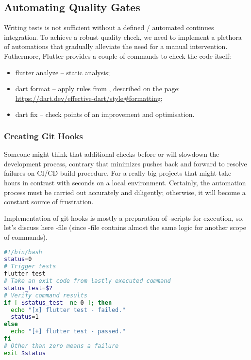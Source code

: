 
\subsection{Automating Quality Gates}

Writing tests is not sufficient without a defined / automated continues integration. To achieve a robust quality check, 
we need to implement a plethora of automations that gradually alleviate the need for a manual intervention. Futhermore, 
Flutter provides a couple of commands to check the code itself:

\begin{itemize}
  \item flutter analyze -- static analysis;
  \item dart format -- apply rules from , described on the page:
  \href{https://dart.dev/effective-dart/style\#formatting}{https://dart.dev/effective-dart/style\#formatting};
  \item dart fix -- check points of an improvement and optimisation.
\end{itemize}


\subsubsection{Creating Git Hooks}

Someone might think that additional checks before  or  will slowdown the development process, 
contrary that minimizes pushes back and forward to resolve failures on CI/CD build procedure. For a really big projects
that might take hours in contrast with seconds on a local environment. Certainly, the automation process must be 
carried out accurately and diligently; otherwise, it will become a constant source of frustration.

Implementation of git hooks is mostly a preparation of -scripts for execution, so, let's discuss here 
-file (since -file contains almost the same logic for another scope of commands).

\begin{lstlisting}[language=bash]
#!/bin/bash
status=0
# Trigger tests
flutter test 
# Take an exit code from lastly executed command
status_test=$? 
# Verify command results
if [ $status_test -ne 0 ]; then
  echo "[x] flutter test - failed."
  status=1
else
  echo "[+] flutter test - passed."
fi
# Other than zero means a failure
exit $status
\end{lstlisting}


